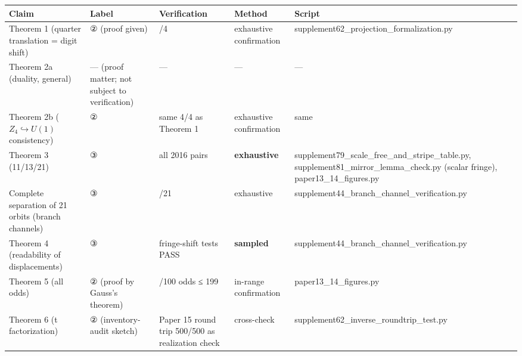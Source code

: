 \documentclass[
]{ltjsarticle}
\newcounter{none} %
\begin{document}
{\def\LTcaptype{none} %
\begin{longtable}[]{@{}
  >{\raggedright\arraybackslash}p{}
  >{\raggedright\arraybackslash}p{}
  >{\raggedright\arraybackslash}p{}
  >{\raggedright\arraybackslash}p{}
  >{\raggedright\arraybackslash}p{}@{}}
\toprule\noalign{}
\begin{minipage}[b]{\linewidth}\raggedright
Claim
\end{minipage} & \begin{minipage}[b]{\linewidth}\raggedright
Label
\end{minipage} & \begin{minipage}[b]{\linewidth}\raggedright
Verification
\end{minipage} & \begin{minipage}[b]{\linewidth}\raggedright
Method
\end{minipage} & \begin{minipage}[b]{\linewidth}\raggedright
Script
\end{minipage} \\
\midrule\noalign{}
\endhead
\bottomrule\noalign{}
\endlastfoot
Theorem 1 (quarter translation = digit shift) & ② (proof given) & 4/4 &
exhaustive confirmation & supplement62\_projection\_formalization.py \\
Theorem 2a (duality, general) & --- (proof matter; not subject to
verification) & --- & --- & --- \\
Theorem 2b (\(Z_4\hookrightarrow U(1)\) consistency) & ② & same 4/4 as
Theorem 1 & exhaustive confirmation & same \\
Theorem 3 (11/13/21) & ③ & all 2016 pairs & \textbf{exhaustive} &
supplement79\_scale\_free\_and\_stripe\_table.py,
supplement81\_mirror\_lemma\_check.py (scalar fringe),
paper13\_14\_figures.py \\
Complete separation of 21 orbits (branch channels) & ③ & 21/21 &
exhaustive & supplement44\_branch\_channel\_verification.py \\
Theorem 4 (readability of displacements) & ③ & 2 fringe-shift tests PASS
& \textbf{sampled} & supplement44\_branch\_channel\_verification.py \\
Theorem 5 (all odds) & ② (proof by Gauss's theorem) & 100/100 odds ≤ 199
& in-range confirmation & paper13\_14\_figures.py \\
Theorem 6 (t factorization) & ② (inventory-audit sketch) & Paper 15
round trip 500/500 as realization check & cross-check &
supplement62\_inverse\_roundtrip\_test.py \\
\end{longtable}
}
\end{document}
